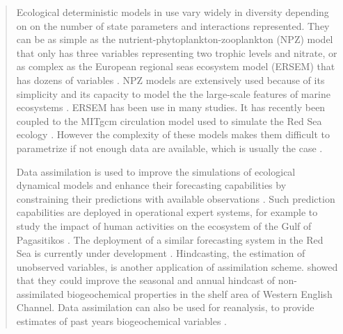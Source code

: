 \begin{quotation}
Ecological deterministic models in use vary widely in diversity depending on on
the number of state parameters and interactions represented.  They can be as
simple as the nutrient-phytoplankton-zooplankton (NPZ) model
\citep{Anderson2005} that only has three variables representing two trophic
levels and nitrate, or as complex as the European regional seas ecosystem model
(ERSEM) that has dozens of variables \citep{Baretta1995}. NPZ models are
extensively used because of its simplicity and its capacity to model the the
large-scale features of marine ecosystems \citep{Anderson2005}.  ERSEM has been
use in many studies. It has recently been coupled to the MITgcm circulation
model used to simulate the Red Sea ecology \citep{Triantafyllou2014}. However
the complexity of these models makes them difficult to parametrize if not
enough data are available, which is usually the case \citep{Anderson2005}.


Data assimilation is used to improve the simulations of ecological dynamical
models and enhance their forecasting capabilities by constraining their
predictions with available observations \cite{Edwards2015}. Such prediction
capabilities are deployed in operational expert systems, for example to study
the impact of human activities on the ecosystem of the Gulf of Pagasitikos
\citep{Korres2012}. The deployment of a similar forecasting system in the Red
Sea is currently under development \citep{Triantafyllou2014}. Hindcasting, the
estimation of unobserved variables, is another application of assimilation
scheme. \citet{Ciavatta2011}  showed that they could improve the seasonal and
annual hindcast of non-assimilated biogeochemical properties in the shelf area
of Western English Channel. Data assimilation can also be used for reanalysis,
to provide estimates of past years biogeochemical variables
\citep{Fontana2013}. 


\end{quotation}
